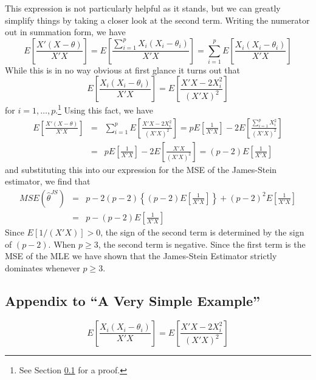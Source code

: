 This expression is not particularly helpful as it stands, but we can greatly simplify things by taking a closer look at the second term.
Writing the numerator out in summation form, we have
\begin{equation*}
  E\left[ \frac{X'(X-\theta)}{X'X} \right] = E\left[ \frac{\sum_{i=1}^{p} X_i\left( X_i - \theta_i \right)}{X'X} \right] = \sum_{i=1}^{p} E\left[ \frac{X_i(X_i - \theta_i)}{X'X} \right]
\end{equation*}
While this is in no way obvious at first glance it turns out that 
\begin{equation*}
  E\left[ \frac{X_i(X_i - \theta_i)}{X'X} \right] = E\left[ \frac{X'X - 2 X_i^2}{\left( X'X \right)^2} \right]
\end{equation*}
for $i = 1, \hdots, p$.\footnote{See Section \ref{sec:JamesSteinIntegral} for a proof.}
Using this fact, we have
\begin{eqnarray*}
  E\left[ \frac{X'(X-\theta)}{X'X} \right] &=&  \sum_{i=1}^{p} E\left[ \frac{X'X - 2 X_i^2}{\left( X'X \right)^2} \right] = p E\left[ \frac{1}{X'X} \right] - 2 E\left[ \frac{\sum_{i=1}^{p} X_i^2}{(X'X)^2} \right]\\
  &=& p E\left[ \frac{1}{X'X} \right] - 2 E\left[ \frac{X'X}{(X'X)^2} \right] = \left( p-2 \right)E\left[ \frac{1}{X'X} \right]
\end{eqnarray*}
and substituting this into our expression for the MSE of the James-Stein estimator, we find that
\begin{eqnarray*}
  MSE\left( \hat{\theta}^{JS} \right) &=& p - 2(p-2)\left\{ \left( p-2 \right) E\left[ \frac{1}{X'X} \right] \right\} + \left( p-2 \right)^{2}E\left[ \frac{1}{X'X} \right]\\
  &=& p - \left( p-2 \right) E\left[ \frac{1}{X'X} \right]
\end{eqnarray*}
Since $E\left[ 1/(X'X) \right] > 0$, the sign of the second term is determined by the sign of $\left( p-2 \right)$.
When $p\geq 3$, the second term is negative.
Since the first term is the MSE of the MLE we have shown that the James-Stein Estimator strictly dominates whenever $p\geq 3$.



\subsection{Appendix to ``A Very Simple Example''}
\label{sec:JamesSteinIntegral}
\begin{equation*}
  E\left[ \frac{X_i(X_i - \theta_i)}{X'X} \right] = E\left[ \frac{X'X - 2 X_i^2}{\left( X'X \right)^2} \right]
\end{equation*}

